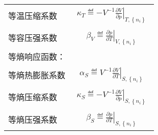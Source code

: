 \documentclass[main.tex]{subfiles}
\begin{document}
\begin{longtable}{m{}m{}}
    等温压缩系数                                       & \begin{align}\kappa_T\eqdef-V^{-1}\left.\frac{\partial V}{\partial p}\right|_{T,\left\{n_i\right\}}\end{align}                                                                                                                                                             \\[-4ex]
    等容压强系数                                       & \begin{align}\beta_V\eqdef\left.\frac{\partial p}{\partial T}\right|_{V,\left\{n_i\right\}}\end{align}                                                                                                                                                                     \\
    \multicolumn{2}{l}{{等熵响应函数：}}                                                                                                                                                                                                                                                                                             \\[-4ex]
    等熵热膨胀系数                                      & \begin{align}\alpha_S\eqdef V^{-1}\left.\frac{\partial V}{\partial T}\right|_{S,\left\{n_i\right\}}\end{align}                                                                                                                                                             \\[-4ex]
    等熵压缩系数                                       & \begin{align}\kappa_S\eqdef -V^{-1}\left.\frac{\partial V}{\partial p}\right|_{S,\left\{n_i\right\}}\end{align}                                                                                                                                                            \\[-4ex]
    等熵压强系数                                       & \begin{align}\beta_S\eqdef\left.\frac{\partial p}{\partial T}\right|_{S,\left\{n_i\right\}}\end{align}                                                                                                                                                                     \\

\end{longtable}
\end{document}
